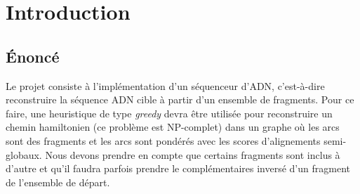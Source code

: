 \section{Introduction}
\subsection{Énoncé}
Le projet consiste à l'implémentation d'un séquenceur d'ADN,
c'est-à-dire reconstruire la séquence ADN cible à partir d'un ensemble de fragments.
Pour ce faire, une heuristique de type \emph{greedy} devra être utilisée pour
reconstruire un chemin hamiltonien (ce problème est NP-complet) dans un graphe
où les arcs sont des fragments et
les arcs sont pondérés avec les scores d'alignements semi-globaux.
Nous devons prendre en compte que certains fragments sont inclus à d'autre et
qu'il faudra parfois prendre le complémentaires inversé d'un fragment de
l'ensemble de départ.
